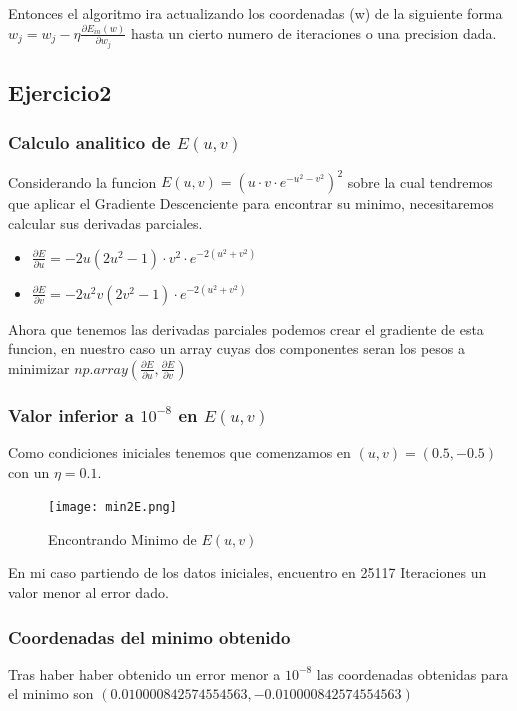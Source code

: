 Entonces el algoritmo ira actualizando los coordenadas (w) de la siguiente forma\newline
$ w_j = w_j - \eta \frac{\partial E_{in}(w)}{\partial w_j}$ hasta un cierto numero de iteraciones o una precision dada.



\subsection{Ejercicio2}
\subsubsection{Calculo analitico de $E(u,v)$}
Considerando la funcion $E(u,v) =(u\cdot v\cdot e^{-u^2-v^2})^2$ sobre la cual tendremos que aplicar el Gradiente Descenciente para encontrar su minimo, necesitaremos calcular sus derivadas parciales.

\begin{itemize}
  \item $\displaystyle \frac{\partial E}{\partial u} = -2u(2u^2 -1)\cdot v^2 \cdot e^{-2(u^2+v^2)}$
  \item $\displaystyle \frac{\partial E}{\partial v} = -2u^2v (2v^2-1) \cdot e^{-2(u^2+v^2)}$
\end{itemize}

Ahora que tenemos las derivadas parciales podemos crear el gradiente de esta funcion, en nuestro caso un array cuyas dos componentes seran los pesos a minimizar
$np.array(\frac{\partial E}{\partial u}, \frac{\partial E}{\partial v})$
\newpage 
\subsubsection{Valor inferior a $10^{-8}$ en $E(u,v)$}
Como condiciones iniciales tenemos que comenzamos en $(u,v) = (0.5,-0.5)$ con un $\eta = 0.1$.

{
\begin{figure}
  \centering
  \texttt{[image: min2E.png]}
  \caption{Encontrando Minimo de $E(u,v)$}
\end{figure}

En mi caso partiendo de los datos iniciales, encuentro en 25117 Iteraciones un valor menor al error dado.

\par
\vspace{5mm}

\subsubsection{Coordenadas del minimo obtenido}
Tras haber haber obtenido un error menor a $10^{-8}$ las coordenadas obtenidas para el minimo son
\newline $( 0.010000842574554563 ,  -0.010000842574554563 )$
\vspace{30mm}

}
